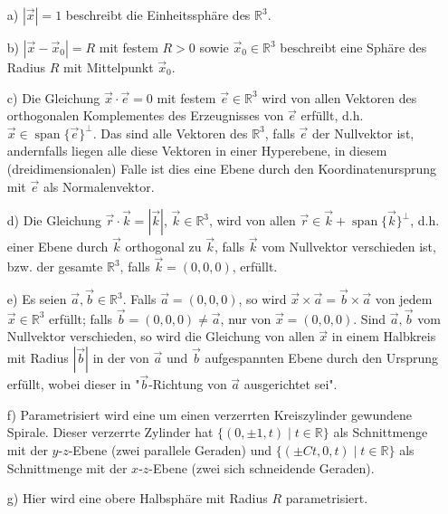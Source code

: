 \documentclass[11pt]{article}
\theoremstyle{plain}
\theoremstyle{definition}
\theoremstyle{remark}
\newcommand{\R}{\mathbb{R}}
\begin{document}
\begin{itemize}
\item[a)] 
$ | \vec{x} | = 1 $ beschreibt die Einheitssphäre des $ \R^3 $. 

\item[b)] 
$ | \vec{x} - \vec{x}_0 | = R $ mit festem $ R > 0 $ sowie $ \vec{x}_0 \in \R^3 $ beschreibt eine Sphäre des Radius $ R $ mit Mittelpunkt $ \vec{x}_0 $. 

\item[c)] 
Die Gleichung $ \vec{x} \cdot \vec{e} = 0 $ mit festem $ \vec{e} \in \R^3 $ 
wird von allen Vektoren des orthogonalen Komplementes des Erzeugnisses von $ \vec{e} $ erfüllt, d.h. $ \vec{x} \in \operatorname{span} \{ \vec{e} \}^\perp $. 
Das sind alle Vektoren des $ \R^3 $, falls $ \vec{e} $ der Nullvektor ist, andernfalls liegen alle diese Vektoren in einer Hyperebene, in diesem (dreidimensionalen) Falle ist dies eine Ebene durch den Koordinatenursprung mit $ \vec{e} $ als Normalenvektor. 

\item[d)] 
Die Gleichung $ \vec r \cdot \vec k = | \vec k | $, $ \vec k \in\R^3 $, wird von allen $ \vec r \in \vec k + \operatorname{span} \{ \vec k \}^\perp $, d.h. einer Ebene durch $ \vec k $ orthogonal zu $ \vec k $, falls $ \vec k $ vom Nullvektor verschieden ist, bzw. der gesamte $ \R^3 $, falls $ \vec k = (0,0,0) $, erfüllt. 

\item[e)] 
Es seien $ \vec a, \vec b \in \R^3 $. Falls $ \vec a = (0,0,0) $, so wird $ \vec x \times \vec a = \vec b \times \vec a $ von jedem $ \vec x \in \R^3 $ erfüllt; falls $ \vec b = (0,0,0) \neq \vec a $, nur von $ \vec x = (0,0,0) $. Sind $ \vec a, \vec b $ vom Nullvektor verschieden, so wird die Gleichung von allen $ \vec x $ in einem Halbkreis mit Radius $ |\vec b| $ in der von $ \vec a $ und $ \vec b $ aufgespannten Ebene durch den Ursprung erfüllt, wobei dieser in "$ \vec b $-Richtung von $ \vec a $ ausgerichtet sei". 

\item[f)]
Parametrisiert wird eine um einen verzerrten Kreiszylinder gewundene Spirale. Dieser verzerrte Zylinder hat $\{ (0,\pm 1, t) \mid t \in \R \}$ als Schnittmenge mit der $y$-$z$-Ebene (zwei parallele Geraden) und $\{ (\pm Ct, 0, t) \mid t \in \R\}$ als Schnittmenge mit der $x$-$z$-Ebene (zwei sich schneidende Geraden).

\item[g)] 
Hier wird eine obere Halbsphäre mit Radius $ R $ parametrisiert. 
\end{itemize}
\end{document}
